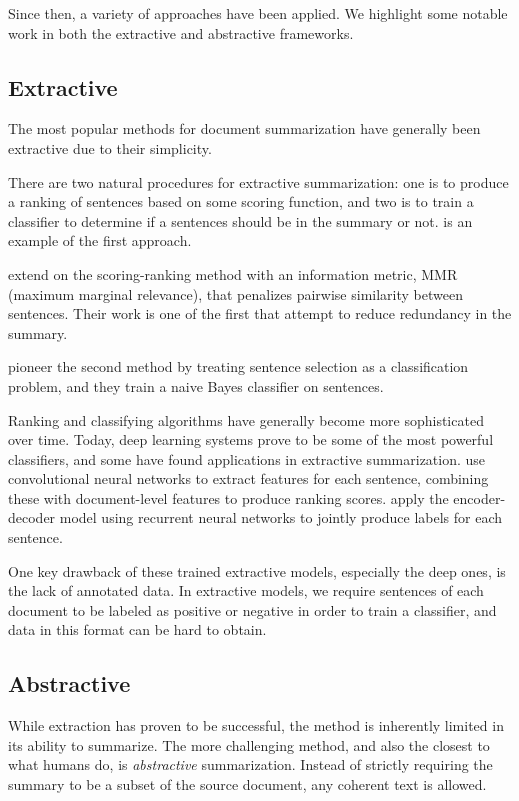 \documentclass[12pt]{report}
\begin{document}
Since then, a variety of approaches have been applied. We highlight some notable work in both the extractive and abstractive frameworks.

\subsection{Extractive}
The most popular methods for document summarization have generally been extractive due to their simplicity.

There are two natural procedures for extractive summarization: one is to produce a ranking of sentences based on some scoring function, and two is to train a classifier to determine if a sentences should be in the summary or not. \citet{luhn1958automatic} is an example of the first approach.

\citet{Carbonell1998} extend on the scoring-ranking method with an information metric, MMR (maximum marginal relevance), that penalizes pairwise similarity between sentences. Their work is one of the first that attempt to reduce redundancy in the summary.

\citet{Kupiec1995} pioneer the second method by treating sentence selection as a classification problem, and they train a naive Bayes classifier on sentences.

Ranking and classifying algorithms have generally become more sophisticated over time. Today, deep learning systems prove to be some of the most powerful classifiers, and some have found applications in extractive summarization.
\citet{Cao2015} use convolutional neural networks to extract features for each sentence, combining these with document-level features to produce ranking scores.
\citet{Cheng2016} apply the encoder-decoder model using recurrent neural networks to jointly produce labels for each sentence.

One key drawback of these trained extractive models, especially the deep ones, is the lack of annotated data. In extractive models, we require sentences of each document to be labeled as positive or negative in order to train a classifier, and data in this format can be hard to obtain.

%
% 




\subsection{Abstractive} While extraction has proven to be successful, the method is inherently limited in its ability to summarize. The more challenging method, and also the closest to what humans do, is \emph{abstractive} summarization. Instead of strictly requiring the summary to be a subset of the source document, any coherent text is allowed.
\end{document}
